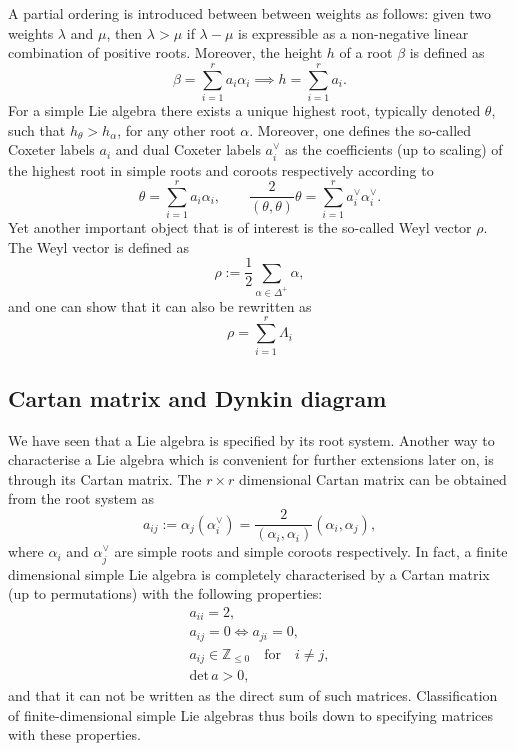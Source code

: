 A partial ordering is introduced between between weights as follows: given two weights $\lambda$ and $\mu$, then $\lambda>\mu$ if $\lambda-\mu$ is expressible as a non-negative linear combination of positive roots. Moreover, the height $h$ of a root $\beta$ is defined as 
\begin{equation}
    \beta = \sum_{i=1}^ra_i\alpha_i\implies h = \sum_{i=1}^r a_i.
\end{equation}
For a simple Lie algebra there exists a unique highest root, typically denoted $\theta$, such that $h_\theta>h_\alpha$, for any other root $\alpha$. Moreover, one defines the so-called Coxeter labels $a_i$ and dual Coxeter labels $a_i^\vee$ as the coefficients (up to scaling) of the highest root in simple roots and coroots respectively according to
\begin{equation}\label{eq:HighestRoot}
    \theta = \sum_{i=1}^ra_i\alpha_{i},\qquad \frac{2}{(\theta,\theta)}\theta = \sum_{i=1}^r a_i^\vee \alpha_{i}^{\vee}.
\end{equation}
Yet another important object that is of interest is the so-called Weyl vector $\rho$. The Weyl vector is defined as
\begin{equation}\label{eq:Weylroots}
    \rho := \frac{1}{2}\sum_{\alpha\in\Delta^+}\alpha,
\end{equation}
and one can show that it can also be rewritten as
\begin{equation}
        \rho = \sum_{i=1}^r \Lambda_{i}
\end{equation}

\subsection{Cartan matrix and Dynkin diagram}
We have seen that a Lie algebra is specified by its root system. Another way to characterise a Lie algebra which is convenient for further extensions later on, is through its Cartan matrix. The $r\times r$ dimensional Cartan matrix can be obtained from the root system as
\begin{equation}\label{eq:CartanFirst}
    a_{ij} := \alpha_j(\alpha_{i}^\vee)  = \frac{2}{(\alpha_{i},\alpha_{i})}(\alpha_{i},\alpha_{j}),
\end{equation}
where $\alpha_{i}$ and $\alpha_{j}^{\vee}$ are simple roots and simple coroots respectively. In fact, a finite dimensional simple Lie algebra is completely characterised by a Cartan matrix (up to permutations) with the following properties:
\begin{equation}\label{eq:Cartanprop}
    \begin{aligned}
        a_{ii} = 2,\\
        a_{ij} = 0 \Longleftrightarrow a_{ji} = 0,\\
        a_{ij}\in \mathbb{Z}_{\leq 0} \quad\text{for}\quad i\neq j,\\
        \text{det}\, a >0,
    \end{aligned}
\end{equation}
and that it can not be written as the direct sum of such matrices. Classification of finite-dimensional simple Lie algebras thus boils down to specifying matrices with these properties. 

